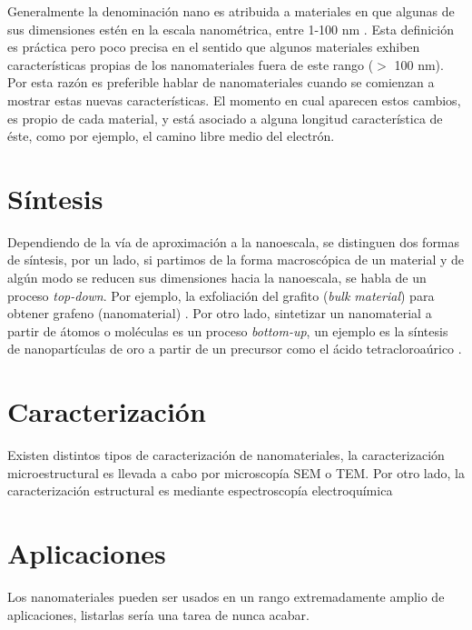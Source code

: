 
Generalmente la denominación nano es atribuida a materiales en que algunas de sus dimensiones estén en la escala nanométrica, entre 1-100 nm \citep{Gressler2013}. Esta definición es práctica pero poco precisa en el sentido que algunos materiales exhiben características propias de los nanomateriales fuera de este rango ($>$ 100 nm). Por esta razón es preferible hablar de nanomateriales cuando se comienzan a mostrar estas nuevas características. El momento en cual aparecen estos cambios, es propio de cada material, y está asociado a alguna longitud característica de éste, como por ejemplo, el camino libre medio del electrón.

\section{Síntesis}
Dependiendo de la vía de aproximación a la nanoescala, se distinguen dos formas de síntesis, por un lado, si partimos de la forma macroscópica de un material y de algún modo se reducen sus dimensiones hacia la nanoescala, se habla de un proceso \textit{top-down}. Por ejemplo, la exfoliación del grafito (\textit{bulk material}) para obtener grafeno (nanomaterial) \citep{Novoselov2004}.  Por otro lado, sintetizar un nanomaterial a partir de átomos o moléculas es un proceso \textit{bottom-up}, un ejemplo es la síntesis de nanopartículas de oro a partir de un precursor como el ácido tetracloroaúrico \citep{Daniel2004}.

\section{Caracterización}
Existen distintos tipos de caracterización de nanomateriales, la caracterización microestructural es llevada a cabo por microscopía SEM o TEM. Por otro lado, la caracterización estructural es mediante espectroscopía
electroquímica


\section{Aplicaciones}
Los nanomateriales pueden ser usados en un rango extremadamente amplio de aplicaciones, listarlas sería una tarea de nunca acabar. 

